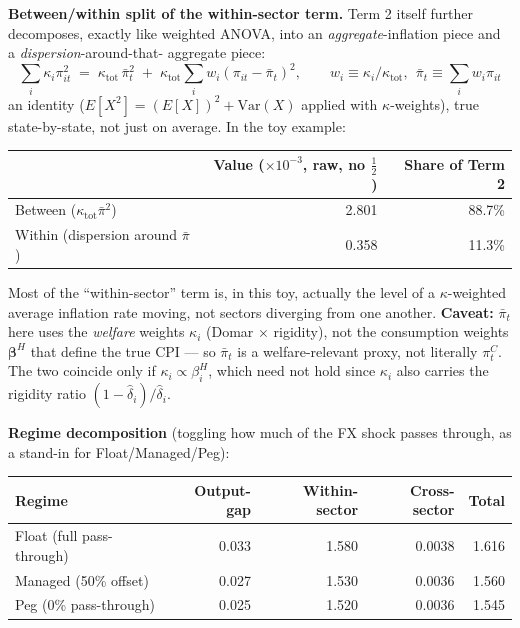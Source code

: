 \documentclass[12pt]{article}
\begin{document}
\textbf{Between/within split of the within-sector term.} Term 2 itself further decomposes, exactly
like weighted ANOVA, into an \emph{aggregate}-inflation piece and a \emph{dispersion}-around-that-
aggregate piece:
\begin{equation}
    \sum_i \kappa_i \pi_{it}^2 \;=\; \kappa_{\mathrm{tot}}\,\bar\pi_t^2 \;+\; \kappa_{\mathrm{tot}}\sum_i w_i(\pi_{it}-\bar\pi_t)^2,
    \qquad w_i \equiv \kappa_i/\kappa_{\mathrm{tot}},\ \ \bar\pi_t\equiv\sum_i w_i\pi_{it}
    \label{eq:between_within}
\end{equation}
an identity ($E[X^2]=(E[X])^2+\mathrm{Var}(X)$ applied with $\kappa$-weights), true state-by-state,
not just on average. In the toy example:
\begin{center}
\begin{tabular}{lrr}
\toprule
 & Value ($\times10^{-3}$, raw, no $\tfrac12$) & Share of Term 2 \\
\midrule
Between ($\kappa_{\mathrm{tot}}\bar\pi^2$) & 2.801 & 88.7\% \\
Within (dispersion around $\bar\pi$) & 0.358 & 11.3\% \\
\bottomrule
\end{tabular}
\end{center}
Most of the ``within-sector'' term is, in this toy, actually the level of a $\kappa$-weighted average
inflation rate moving, not sectors diverging from one another. \textbf{Caveat:} $\bar\pi_t$ here uses
the \emph{welfare} weights $\kappa_i$ (Domar $\times$ rigidity), not the consumption weights
$\bm\beta^H$ that define the true CPI — so $\bar\pi_t$ is a welfare-relevant proxy, not literally
$\pi_t^C$. The two coincide only if $\kappa_i\propto\beta_i^H$, which need not hold since $\kappa_i$
also carries the rigidity ratio $(1-\hat\delta_i)/\hat\delta_i$.

\textbf{Regime decomposition} (toggling how much of the FX shock passes through, as a stand-in for
Float/Managed/Peg):
\begin{center}
\begin{tabular}{lrrrr}
\toprule
Regime & Output-gap & Within-sector & Cross-sector & Total \\
\midrule
Float (full pass-through) & 0.033 & 1.580 & 0.0038 & 1.616 \\
Managed (50\% offset) & 0.027 & 1.530 & 0.0036 & 1.560 \\
Peg (0\% pass-through) & 0.025 & 1.520 & 0.0036 & 1.545 \\
\bottomrule
\end{tabular}
\end{center}
\end{document}
